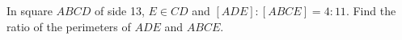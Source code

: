In square $ ABCD $ of side 13, $ E\in CD $ and $[ADE]:[ABCE]=4:11 $. Find the ratio of the perimeters of $ ADE $ and $ ABCE $.
